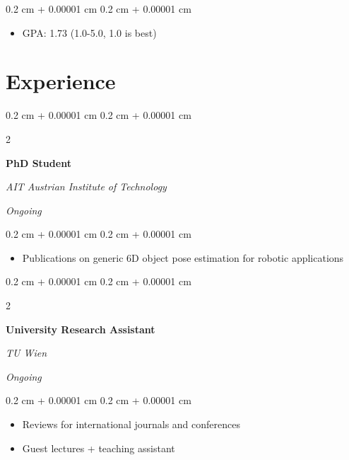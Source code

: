 \documentclass[10pt, letterpaper]{article}
\newenvironment{highlights}{
    \begin{itemize}[
        topsep=0.10 cm,
        parsep=0.10 cm,
        partopsep=0pt,
        itemsep=0pt,
        leftmargin=0.4 cm + 10pt
    ]
}{
    \end{itemize}
} %
\newenvironment{onecolentry}{
    \begin{adjustwidth}{
        0.2 cm + 0.00001 cm
    }{
        0.2 cm + 0.00001 cm
    }
}{
    \end{adjustwidth}
} %
\newenvironment{twocolentry}[2][]{
    \onecolentry
    \def\secondColumn{#2}
    \setcolumnwidth{\fill, 4.5 cm}
    \begin{paracol}{2}
}{
    \switchcolumn \raggedleft \secondColumn
    \end{paracol}
    \endonecolentry
} %
\begin{document}
        \vspace{0.10 cm}
        \begin{onecolentry}
            \begin{highlights}
                \item GPA: 1.73 (1.0-5.0, 1.0 is best)
            \end{highlights}
        \end{onecolentry}



    
    \section{Experience}



        
        \begin{twocolentry}{
            
            
        \textit{Ongoing}}
            \textbf{PhD Student}
            
            \textit{AIT Austrian Institute of Technology}
        \end{twocolentry}

        \vspace{0.10 cm}
        \begin{onecolentry}
            \begin{highlights}
                \item Publications on generic 6D object pose estimation for robotic applications
            \end{highlights}
        \end{onecolentry}


        \vspace{0.2 cm}

        \begin{twocolentry}{
            
            
        \textit{Ongoing}}
            \textbf{University Research Assistant}
            
            \textit{TU Wien}
        \end{twocolentry}

        \vspace{0.10 cm}
        \begin{onecolentry}
            \begin{highlights}
                \item Reviews for international journals and conferences
                \item Guest lectures + teaching assistant
            \end{highlights}
        \end{onecolentry}
\end{document}
